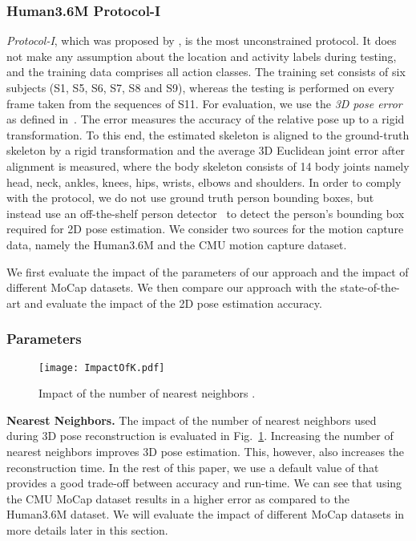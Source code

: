 \documentclass[10pt,journal,compsoc]{IEEEtran}
\begin{document}
\subsubsection{Human3.6M Protocol-I}
\emph{Protocol-I}, which was proposed by \cite{Ilya_2014}, is the most unconstrained protocol.
It does not 
make any assumption about the location and activity labels during testing, and the training data comprises all
action classes. The training set consists of six subjects (S1, S5, S6, S7, S8 and S9), whereas the testing 
is performed on every  frame taken from the sequences of S11. For evaluation, we use the \textit{3D pose error} 
as defined in~\cite{SimoSerraCVPR2012}. The error measures the accuracy of the relative pose up to a rigid transformation.
To this end, the estimated skeleton is aligned to the ground-truth skeleton by a rigid transformation and the average 3D
Euclidean joint error after alignment is measured, where the body skeleton consists of 14 body joints namely head, neck,
ankles, knees, hips, wrists, elbows and shoulders. In order to comply with the protocol, we do not use ground truth person
bounding boxes, but instead use an off-the-shelf person detector~\cite{RenHG0CoRR15} to detect the person's 
bounding box required for 2D pose estimation. We consider two sources for the motion capture data, namely the Human3.6M and
the CMU motion capture dataset. 

We first evaluate the impact of the parameters of our approach and the impact of different MoCap datasets. We then compare our approach with the state-of-the-art and evaluate the impact of the 2D pose estimation accuracy.    

\subsubsection*{Parameters}

\begin{figure}[t]
\begin{center}
\texttt{[image: ImpactOfK.pdf]}
\end{center}
   \caption{Impact of the number of nearest neighbors .}
\label{fig:ImpactOfK}
\end{figure}

\noindent\textbf{Nearest Neighbors.} The impact of the number of nearest neighbors  used during
3D pose reconstruction is evaluated in Fig.~\ref{fig:ImpactOfK}. Increasing the number of nearest neighbors
improves 3D pose estimation. This, however, also increases the reconstruction time. In the rest of this paper, we use a default value of  that provides a good trade-off between accuracy and run-time. We can see 
that using the CMU MoCap dataset results in a higher error as compared to the Human3.6M dataset. We will evaluate
the impact of different MoCap datasets in more details later in this section. \\
\end{document}
